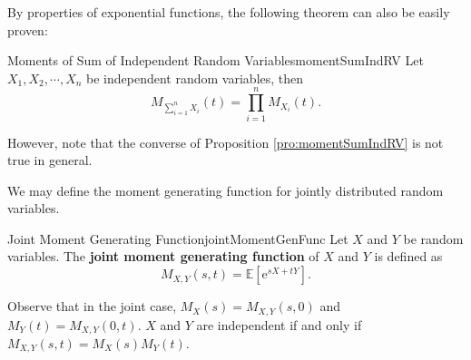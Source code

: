 \documentclass[math, code]{amznotes}
\theoremstyle{remark}
\newcommand{\e}{\mathrm{e}}
\begin{document}
By properties of exponential functions, the following theorem can also be easily proven:
\begin{probox}{Moments of Sum of Independent Random Variables}{momentSumIndRV}
    Let $X_1, X_2, \cdots, X_n$ be independent random variables, then 
    \begin{equation*}
        M_{\sum_{i = 1}^{n}X_i}\left(t\right) = \prod_{i = 1}^{n}M_{X_i}\left(t\right).
    \end{equation*}
\end{probox}
However, note that the converse of Proposition \ref{pro:momentSumIndRV} is not true in general.

We may define the moment generating function for jointly distributed random variables.
\begin{dfnbox}{Joint Moment Generating Function}{jointMomentGenFunc}
    Let $X$ and $Y$ be random variables. The {\color{red} \textbf{joint moment generating function}} of $X$ and $Y$ is defined as
    \begin{equation*}
        M_{X, Y}\left(s, t\right) = \mathbb{E}\left[\e^{sX + tY}\right].
    \end{equation*}
\end{dfnbox}
Observe that in the joint case, $M_X\left(s\right) = M_{X, Y}\left(s, 0\right)$ and $M_Y\left(t\right) = M_{X, Y}\left(0, t\right)$. $X$ and $Y$ are independent if and only if $M_{X, Y}\left(s, t\right) = M_X\left(s\right)M_Y\left(t\right)$.
\end{document}
